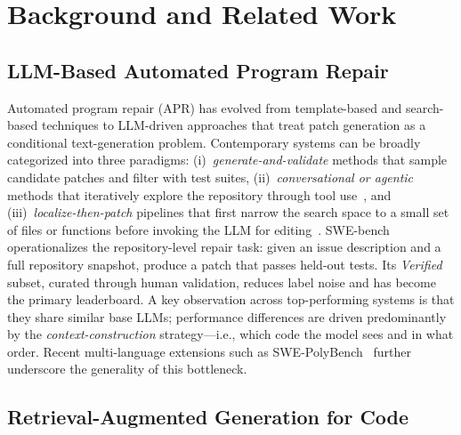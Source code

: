 \section{Background and Related Work}\label{sec:related}

\subsection{LLM-Based Automated Program Repair}

Automated program repair (APR) has evolved from template-based and search-based techniques to LLM-driven approaches that treat patch generation as a conditional text-generation problem. Contemporary systems can be broadly categorized into three paradigms: (i)~\emph{generate-and-validate} methods that sample candidate patches and filter with test suites, (ii)~\emph{conversational or agentic} methods that iteratively explore the repository through tool use~\cite{yang2024sweagent, zhang2024autocoderover}, and (iii)~\emph{localize-then-patch} pipelines that first narrow the search space to a small set of files or functions before invoking the LLM for editing~\cite{xia2024agentless}. SWE-bench~\cite{swebench2024} operationalizes the repository-level repair task: given an issue description and a full repository snapshot, produce a patch that passes held-out tests. Its \emph{Verified} subset, curated through human validation, reduces label noise and has become the primary leaderboard. A key observation across top-performing systems is that they share similar base LLMs; performance differences are driven predominantly by the \emph{context-construction} strategy---i.e., which code the model sees and in what order. Recent multi-language extensions such as SWE-PolyBench~\cite{swepolybench2025} further underscore the generality of this bottleneck.

\subsection{Retrieval-Augmented Generation for Code}

